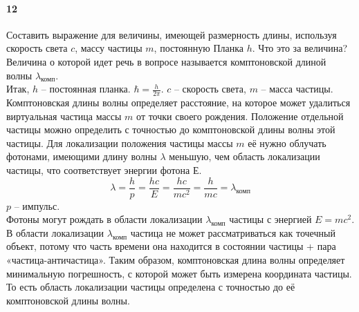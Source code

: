 


\paragraph{12}
Составить выражение для величины, имеющей размерность длины, используя скорость света $c$, массу частицы $m$, постоянную Планка $h$. Что это за величина?\\

Величина о которой идет речь в вопросе называется комптоновской длиной волны $\lambda_\text{комп}$.\\
Итак, $h$ -- постоянная планка. $\hbar = \frac{h}{2\pi}$. $c$ -- скорость света, $m$ -- масса частицы.\\
 Комптоновская длины волны определяет расстояние, на которое может удалиться виртуальная частица массы $m$ от точки своего рождения. Положение отдельной частицы можно определить с точностью до комптоновской длины волны этой частицы. Для локализации положения частицы массы $m$ её нужно облучать фотонами, имеющими длину волны $\lambda$ меньшую, чем область локализации частицы, что соответствует энергии фотона $Е$.
 $$ \lambda = \frac{h}{p} = \frac{hc}{E} = \frac{hc}{mc^2} = \frac{h}{mc} = \lambda_\text{комп}$$
 $p$ -- импульс.\\
 Фотоны могут рождать в области локализации $\lambda_\text{комп}$ частицы с энергией $E = mc^2$. В области локализации $\lambda_\text{комп}$ частица не может рассматриваться как точечный объект, потому что часть времени она находится в состоянии частицы + пара «частица-античастица». Таким образом, комптоновская длина волны определяет минимальную погрешность, с которой может быть измерена координата частицы. То есть область локализации частицы определена с точностью до её комптоновской длины волны.


